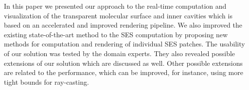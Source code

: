 In this paper we presented our approach to the real-time computation and visualization of the transparent molecular surface and inner cavities which is based on an accelerated and improved rendering pipeline.
We also improved the existing state-of-the-art method to the SES computation by proposing new methods for computation and rendering of individual SES patches.
The usability of our solution was tested by the domain experts. 
They also revealed possible extensions of our solution which are discussed as well.
Other possible extensions are related to the performance, which can be improved, for instance, using more tight bounds for ray-casting.
